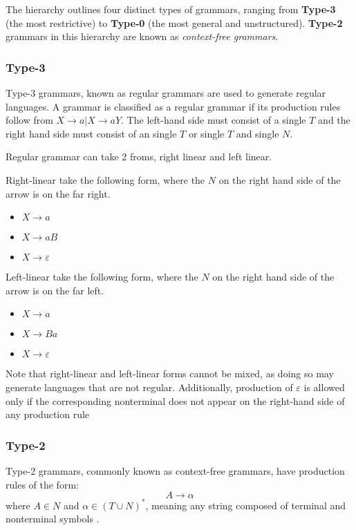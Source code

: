 The hierarchy outlines four distinct types of grammars, ranging from \textbf{Type-3} (the most restrictive) to \textbf{Type-0} (the most general and unstructured). \textbf{Type-2} grammars in this hierarchy are known as \emph{context-free grammars}.

\subsubsection{Type-3}
Type-3 grammars, known as regular grammars are used to generate regular languages. A grammar is classified as a regular grammar if its production rules follow from $X \rightarrow a | X \rightarrow aY$. The left-hand side must consist of a single $T$ and the right hand side must consist of an single $T$ or single $T$ and single $N$.

Regular grammar can take 2 froms, right linear and left linear.

Right-linear take the following form, where the $N$ on the right hand side of the arrow is on the far right.
\begin{itemize}
    \item[] $X \rightarrow a$
    \item[] $X \rightarrow aB$
    \item[] $X \rightarrow \varepsilon$
\end{itemize}

Left-linear take the following form, where the $N$ on the right hand side of the arrow is on the far left.
\begin{itemize}
    \item[] $X \rightarrow a$
    \item[] $X \rightarrow Ba$
    \item[] $X \rightarrow \varepsilon$
\end{itemize}

Note that right-linear and left-linear forms cannot be mixed, 
as doing so may generate languages that are not regular. 
Additionally, production of $\varepsilon$ is allowed only if the corresponding nonterminal 
does not appear on the right-hand side of any production rule \cite{hendriksConsiderItParsed,shiIntelligenceScience2021}

\subsubsection{Type-2}

Type-2 grammars, commonly known as context-free grammars, have production rules of the form:
\[
A \rightarrow \alpha
\]
where \( A \in N \) and \( \alpha \in (T \cup N)^* \), meaning any string composed of terminal and nonterminal symbols \cite{hendriksConsiderItParsed,shiIntelligenceScience2021}.

